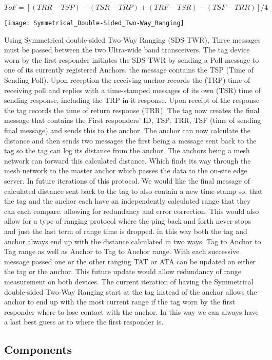 \documentclass[sigconf]{acmart}
\begin{document}
\begin{equation}
 ToF=[(TRR-TSP)-(TSR-TRP)+(TRF-TSR)-(TSF-TRR)]/4
\end{equation}

\texttt{[image: Symmetrical\_Double-Sided\_Two-Way\_Ranging]}

Using Symmetrical double-sided Two-Way Ranging (SDS-TWR), Three messages must be passed between the two Ultra-wide band transceivers. The tag device worn by the first responder initiates the SDS-TWR by sending a Poll message to one of its currently registered Anchors. the message contains the TSP (Time of Sending Poll). Upon reception the receiving anchor records the (TRP) time of receiving poll and replies with a time-stamped messages of its own (TSR) time of sending response, including the TRP in it response. Upon receipt of the response the tag records the time of return response (TRR). The tag now creates the final message that contains the First responders' ID, TSP, TRR, TSF (time of sending final message) and sends this to the anchor. The anchor can now calculate the distance and then sends two messages the first being a message sent back to the tag so the tag can log its distance from the anchor. The anchors being a mesh network can forward this calculated distance. Which finds its way through the mesh network to the master anchor which passes the data to the on-site edge server. In future iterations of this protocol. We would like the final message of calculated distance sent back to the tag to also contain a new time-stamp so, that the tag and the anchor each have an independently calculated range that they can each compare. allowing for redundancy and error correction. This would also allow for a type of ranging protocol where the ping back and forth never stops and just the last term of range time is dropped. in this way both the tag and anchor always end up with the distance calculated in two ways. Tag to Anchor to Tag range as well as Anchor to Tag to Anchor range. With each successive message passed one or the other ranging TAT or ATA can be updated on either the tag or the anchor. This future update would allow redundancy of range measurement on both devices. The current iteration of having the Symmetrical double-sided Two-Way Ranging start at the tag instead of the anchor allows the anchor to end up with the most current range if the tag worn by the first responder where to lose contact with the anchor. In this way we can always have a last best guess as to where the first responder is.


\subsection{Components}
\end{document}
